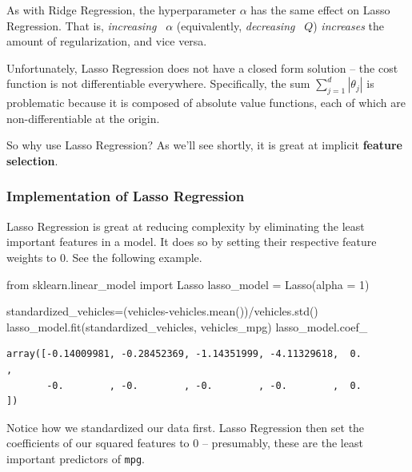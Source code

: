 \documentclass[
  letterpaper,
  DIV=11,
  numbers=noendperiod]{scrreprt}
\newenvironment{Shaded}{\begin{snugshade}}{\end{snugshade}}
\newcommand{\DecValTok}[1]{\textcolor[rgb]{0.68,0.00,0.00}{#1}}
\newcommand{\ImportTok}[1]{\textcolor[rgb]{0.00,0.46,0.62}{#1}}
\newcommand{\NormalTok}[1]{\textcolor[rgb]{0.00,0.23,0.31}{#1}}
\newcommand{\OperatorTok}[1]{\textcolor[rgb]{0.37,0.37,0.37}{#1}}
\begin{document}
As with Ridge Regression, the hyperparameter \(\alpha\) has the same
effect on Lasso Regression. That is, \emph{increasing} ~\(\alpha\)
(equivalently, \emph{decreasing} ~\(Q\)) \emph{increases} the amount of
regularization, and vice versa.

Unfortunately, Lasso Regression does not have a closed form solution --
the cost function is not differentiable everywhere. Specifically, the
sum \(\sum_{j=1}^{d} |\theta_j|\) is problematic because it is composed
of absolute value functions, each of which are non-differentiable at the
origin.

So why use Lasso Regression? As we'll see shortly, it is great at
implicit \textbf{feature selection}.

\hypertarget{implementation-of-lasso-regression}{%
\subsubsection{Implementation of Lasso
Regression}\label{implementation-of-lasso-regression}}

Lasso Regression is great at reducing complexity by eliminating the
least important features in a model. It does so by setting their
respective feature weights to \(0\). See the following example.

\begin{Shaded}
\begin{Highlighting}[]
\ImportTok{from}\NormalTok{ sklearn.linear\_model }\ImportTok{import}\NormalTok{ Lasso}
\NormalTok{lasso\_model }\OperatorTok{=}\NormalTok{ Lasso(alpha }\OperatorTok{=} \DecValTok{1}\NormalTok{)}

\NormalTok{standardized\_vehicles}\OperatorTok{=}\NormalTok{(vehicles}\OperatorTok{{-}}\NormalTok{vehicles.mean())}\OperatorTok{/}\NormalTok{vehicles.std()}
\NormalTok{lasso\_model.fit(standardized\_vehicles, vehicles\_mpg)}
\NormalTok{lasso\_model.coef\_}
\end{Highlighting}
\end{Shaded}

\begin{verbatim}
array([-0.14009981, -0.28452369, -1.14351999, -4.11329618,  0.        ,
       -0.        , -0.        , -0.        , -0.        ,  0.        ])
\end{verbatim}

Notice how we standardized our data first. Lasso Regression then set the
coefficients of our squared features to \(0\) -- presumably, these are
the least important predictors of \texttt{mpg}.
\end{document}
